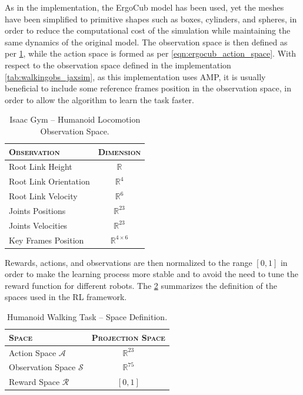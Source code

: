 As in the \jaxsim implementation, the ErgoCub model has been used, yet the meshes have been simplified to primitive shapes such as boxes, cylinders, and spheres, in order to reduce the computational cost of the simulation while maintaining the same dynamics of the original model. The observation space is then defined as per \cref{tab:walkingobs_isaacgym}, while the action space is formed as per \cref{eqn:ergocub_action_space}. With respect to the observation space defined in the \jaxsim implementation \cref{tab:walkingobs_jaxsim}, as this implementation uses \ac{AMP}, it is usually beneficial to include some reference frames position in the observation space, in order to allow the algorithm to learn the task faster.

\begin{table}
    \centering
    \label{tab:walkingobs_isaacgym}
    \begin{tabular}{l c}
        \toprule
        \textsc{Observation}  & \textsc{Dimension}         \\
        \midrule
        Root Link Height      & $\mathbb{R}$               \\
        Root Link Orientation & $\mathbb{R} ^{4}$          \\
        Root Link Velocity    & $\mathbb{R} ^{6}$          \\
        Joints Positions      & $\mathbb{R} ^{23}$         \\
        Joints Velocities     & $\mathbb{R} ^{23}$         \\
        Key Frames Position   & $\mathbb{R} ^{4 \times 6}$ \\
        \bottomrule
    \end{tabular}
    \caption{Isaac Gym -- Humanoid Locomotion Observation Space.}
\end{table}

Rewards, actions, and observations are then normalized to the range $[0,1]$ in order to make the learning process more stable and to avoid the need to tune the reward function for different robots. The \cref{tab:cartpoletaskspacedef} summarizes the definition of the spaces used in the \ac{RL} framework.

\begin{table}
    \centering
    \caption{Humanoid Walking Task -- Space Definition.}
    \label{tab:cartpoletaskspacedef}
    \begin{tabular}{l c}
        \toprule
        \textsc{Space}                  & \textsc{Projection Space} \\
        \midrule
        Action Space $\mathcal{A}$      & $\mathbb{R} ^{23}$        \\
        Observation Space $\mathcal{S}$ & $\mathbb{R} ^{75}$        \\
        Reward Space $\mathcal{R}$      & $[0,1]$                   \\
        \bottomrule
    \end{tabular}
\end{table}


